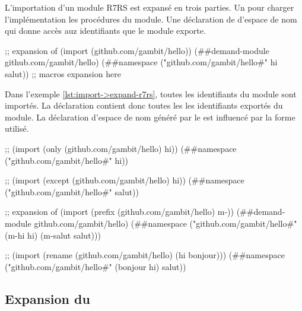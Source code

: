 L'importation d'un module R7RS est expansé en trois parties.
Un  pour charger l'implémentation les procédures du
module. Une déclaration de d'espace de nom qui donne accès auz identifiants
que le module exporte.\\

\begin{center}
  \begin{mplisting}{1}
;; expansion of (import (github.com/gambit/hello))
(##demand-module github.com/gambit/hello)
(##namespace ("github.com/gambit/hello#" hi salut))
;; macros expansion here
\end{mplisting}
\end{center}

Dans l'exemple \ref{lst:import->expand-r7rs}, toutes les identifiants du module
sont importés. La déclaration  contient donc toutes les
les identifiants exportés du module. La déclaration d'espace de nom généré par
le  est influencé par la forme utilisé. \\


\begin{center}
  \begin{mplisting}{1}
;; (import (only (github.com/gambit/hello) hi))
(##namespace ("github.com/gambit/hello#" hi))

;; (import (except (github.com/gambit/hello) hi))
(##namespace ("github.com/gambit/hello#" salut))

;; expansion of (import (prefix (github.com/gambit/hello) m-))
(##demand-module github.com/gambit/hello)
(##namespace ("github.com/gambit/hello#" (m-hi hi) (m-salut salut)))

;; (import (rename (github.com/gambit/hello) (hi bonjour)))
(##namespace ("github.com/gambit/hello#" (bonjour hi) salut))
\end{mplisting}
\end{center}


\subsection{Expansion du }


